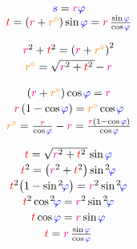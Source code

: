 \documentclass[11pt,twoside]{book}
\newcommand\cosine{\operatorname{cos} \hspace{-0.1ex}}
\newcommand\sine{\operatorname{sin} \hspace{-0.1ex}}
\begin{document}
\[\begin{array}{c}
{\color{blue}s} = {\color{magenta}r} {\color{blue}\varphi} \\
{\color{red}t} = \left( {\color{magenta}r} + {\color{orange}r^{\diamond}} \right) \sine {\color{blue}\varphi} = {\color{magenta}r} \, \textstyle\frac{\sine {\color{blue}\varphi}}{\cosine {\color{blue}\varphi}}
\end{array}\]

\[\begin{array}{c}
{\color{magenta}r}^2 + {\color{red}t}^2 = \left( {\color{magenta}r} + {\color{orange}r^{\diamond}} \right)^2 \\[0.2em]
{\color{orange}r^{\diamond}} = \sqrt{{\color{magenta}r}^2 + {\color{red}t}^2 \,} \! - {\color{magenta}r}
\end{array}\]

\[\begin{array}{c}
\left( {\color{magenta}r} + {\color{orange}r^{\diamond}} \right) \cosine {\color{blue}\varphi} = {\color{magenta}r} \\[0.2em]
{\color{magenta}r} \left( 1 - {\cosine {\color{blue}\varphi}} \right) = {\color{orange}r^{\diamond}} \cosine {\color{blue}\varphi} \\[0.2em]
{\color{orange}r^{\diamond}} = \textstyle\frac{\color{magenta}r}{\cosine {\color{blue}\varphi}} - {\color{magenta}r} = \textstyle\frac{{\color{magenta}r} \left( 1 - {\cosine {\color{blue}\varphi}} \right)}{\cosine {\color{blue}\varphi}}
\end{array}\]

\[\begin{array}{c}
{\color{red}t} = \sqrt{{\color{magenta}r}^2 + {\color{red}t}^2 \,} \sine {\color{blue}\varphi} \\[0.2em]
{\color{red}t}^2 = \left( {\color{magenta}r}^2 + {\color{red}t}^2 \right) \sine^{2\!} {\color{blue}\varphi} \\[0.2em]
{\color{red}t}^2 \! \left( 1 - \sine^{2\!} {\color{blue}\varphi} \right) = {\color{magenta}r}^2 \sine^{2\!} {\color{blue}\varphi} \\[0.2em]
{\color{red}t}^2 \cosine^{2\!} {\color{blue}\varphi} = {\color{magenta}r}^2 \sine^{2\!} {\color{blue}\varphi} \\[0.2em]
{\color{red}t} \cosine {\color{blue}\varphi} = {\color{magenta}r} \sine {\color{blue}\varphi} \\[0.2em]
{\color{red}t} = {\color{magenta}r} \, \textstyle\frac{\sine {\color{blue}\varphi}}{\cosine {\color{blue}\varphi}} \\[0.2em]
\end{array}\]
\end{document}
